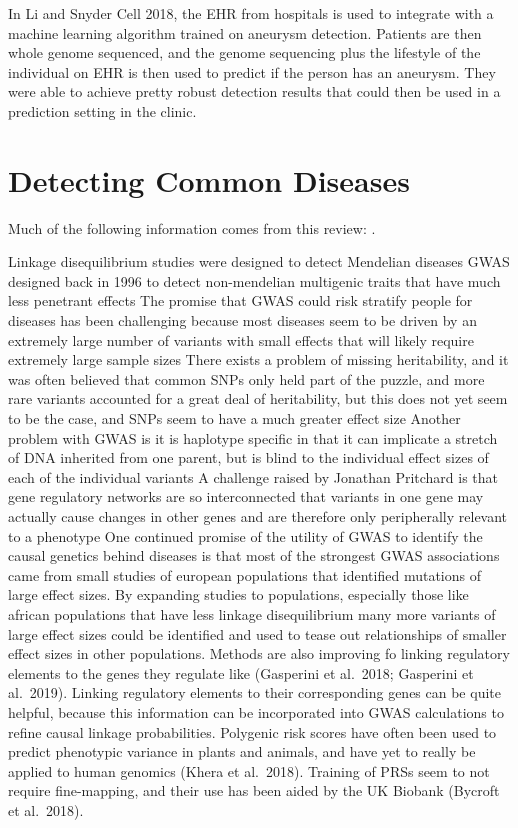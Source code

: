\documentclass[]{book}
\begin{document}
In Li and Snyder Cell 2018, the EHR from hospitals is used to integrate with a machine learning algorithm trained on aneurysm detection. Patients are then whole genome sequenced, and the genome sequencing plus the lifestyle of the individual on EHR is then used to predict if the person has an aneurysm. They were able to achieve pretty robust detection results that could then be used in a prediction setting in the clinic.

\hypertarget{detecting-common-diseases}{%
\section{Detecting Common Diseases}\label{detecting-common-diseases}}

Much of the following information comes from this review: \citep{shendure2019genomic}.

Linkage disequilibrium studies were designed to detect Mendelian diseases
GWAS designed back in 1996 to detect non-mendelian multigenic traits that have much less penetrant effects
The promise that GWAS could risk stratify people for diseases has been challenging because most diseases seem to be driven by an extremely large number of variants with small effects that will likely require extremely large sample sizes
There exists a problem of missing heritability, and it was often believed that common SNPs only held part of the puzzle, and more rare variants accounted for a great deal of heritability, but this does not yet seem to be the case, and SNPs seem to have a much greater effect size
Another problem with GWAS is it is haplotype specific in that it can implicate a stretch of DNA inherited from one parent, but is blind to the individual effect sizes of each of the individual variants
A challenge raised by Jonathan Pritchard is that gene regulatory networks are so interconnected that variants in one gene may actually cause changes in other genes and are therefore only peripherally relevant to a phenotype
One continued promise of the utility of GWAS to identify the causal genetics behind diseases is that most of the strongest GWAS associations came from small studies of european populations that identified mutations of large effect sizes. By expanding studies to populations, especially those like african populations that have less linkage disequilibrium many more variants of large effect sizes could be identified and used to tease out relationships of smaller effect sizes in other populations.
Methods are also improving fo linking regulatory elements to the genes they regulate like (Gasperini et al.~2018; Gasperini et al.~2019).
Linking regulatory elements to their corresponding genes can be quite helpful, because this information can be incorporated into GWAS calculations to refine causal linkage probabilities.
Polygenic risk scores have often been used to predict phenotypic variance in plants and animals, and have yet to really be applied to human genomics (Khera et al.~2018).
Training of PRSs seem to not require fine-mapping, and their use has been aided by the UK Biobank (Bycroft et al.~2018).
\end{document}
